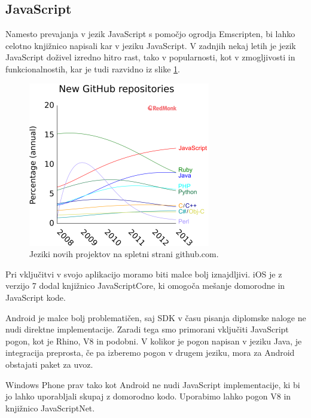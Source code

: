 \subsection{JavaScript}
\label{chap:javascript}

Namesto prevajanja v jezik JavaScript s pomočjo ogrodja Emscripten, bi lahko celotno knjižnico napisali kar v jeziku JavaScript. V zadnjih nekaj letih je jezik JavaScript doživel izredno hitro rast, tako v popularnosti, kot v zmogljivosti in funkcionalnostih, kar je tudi razvidno iz slike \ref{fig:github-jeziki}.

\begin{figure}
 \includegraphics[width=\linewidth]{github-jeziki}
 \caption{Jeziki novih projektov na spletni strani github.com.}
 \label{fig:github-jeziki}
\end{figure}

Pri vključitvi v svojo aplikacijo moramo biti malce bolj iznajdljivi. iOS je z verzijo 7 dodal knjižnico JavaScriptCore, ki omogoča mešanje domorodne in JavaScript kode.

Android je malce bolj problematičen, saj SDK v času pisanja diplomske naloge ne nudi direktne implementacije. Zaradi tega smo primorani vključiti JavaScript pogon, kot je Rhino, V8 in podobni. V kolikor je pogon napisan v jeziku Java, je integracija preprosta, če pa izberemo pogon v drugem jeziku, mora za Android obstajati paket za uvoz.

Windows Phone prav tako kot Android ne nudi JavaScript implementacije, ki bi jo lahko uporabljali skupaj z domorodno kodo. Uporabimo lahko pogon V8 in knjižnico JavaScriptNet\cite{javascriptdotnet}.

